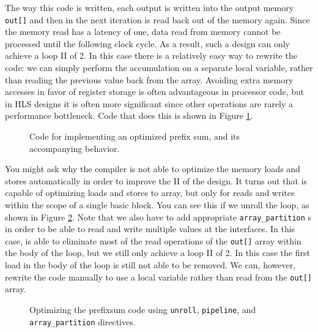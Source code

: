 The way this code is written, each output is written into the output memory \lstinline|out[]| and then in the next iteration is read back out of the memory again.  Since the memory read has a latency of one, data read from memory cannot be processed until the following clock cycle.  As a result, such a design can only achieve a loop II of 2.  In this case there is a relatively easy way to rewrite the code: we can simply perform the accumulation on a separate local variable, rather than reading the previous value back from the array.  Avoiding extra memory accesses in favor of register storage is often advantageous in processor code, but in HLS designs it is often more significant since other operations are rarely a performance bottleneck.  Code that does this is shown in Figure \ref{fig:prefixsum_optimized}.

\begin{figure}
\begin{minipage}{.5\textwidth}

\end{minipage}
\begin{minipage}{.5\textwidth}
\centering

\end{minipage}
\caption{ Code for implementing an optimized prefix sum, and its accompanying behavior. }
\label{fig:prefixsum_optimized}
\end{figure}

You might ask why the compiler is not able to optimize the memory loads and stores automatically in order to improve the II of the design.  It turns out that \VHLS is capable of optimizing loads and stores to array, but only for reads and writes within the scope of a single basic block.  You can see this if we unroll the loop, as shown in Figure \ref{fig:prefixsum_unrolled}.  Note that we also have to add appropriate \lstinline{array_partition} s in order to be able to read and write multiple values at the interfaces.   In this case, \VHLS is able to eliminate most of the read operations of the \lstinline{out[]} array within the body of the loop, but we still only achieve a loop II of 2.  In this case the first load in the body of the loop is still not able to be removed.  We can, however, rewrite the code manually to use a local variable rather than read from the \lstinline{out[]} array.

\begin{figure}
\begin{minipage}{.5\textwidth}

\end{minipage}
\begin{minipage}{.5\textwidth}
\raggedleft

\end{minipage}
\caption{ Optimizing the prefixsum code using \lstinline{unroll}, \lstinline{pipeline}, and \lstinline{array_partition} directives. }
\label{fig:prefixsum_unrolled}
\end{figure}

